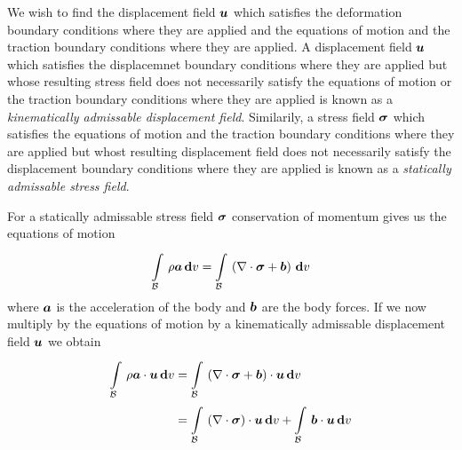 We wish to find the displacement field $\boldsymbol{u}$ which satisfies the
deformation boundary conditions where they are applied and the equations of
motion and the traction boundary conditions where they are applied. A
displacement field $\boldsymbol{u}$ which satisfies the displacemnet boundary
conditions where they are applied but whose resulting stress field does not
necessarily satisfy the equations of motion or the traction boundary
conditions where they are applied is known as a \emph{kinematically admissable
  displacement field}. Similarily, a stress field $\boldsymbol{\mathit{\sigma}}$ which
satisfies the equations of motion and the traction boundary conditions where
they are applied but whost resulting displacement field does not necessarily
satisfy the displacement boundary conditions where they are applied is known
as a \emph{statically admissable stress field}.

For a statically admissable stress field $\boldsymbol{\mathit{\sigma}}$ conservation of
momentum gives us the equations of motion \ie
\begin{equation}
  \gint{\embedmanifold{B}}{}{\rho\vectr{a}}{v}=\gint{\embedmanifold{B}}{}{\pbrac{\divergence{}{\tensor{\sigma}}+\vectr{b}}}{v}
\end{equation}
where $\boldsymbol{a}$ is the acceleration of the body and $\boldsymbol{b}$ are the body
forces. If we now multiply by the equations of motion by a kinematically
admissable displacement field $\boldsymbol{u}$ we obtain
\begin{equation}
  \begin{split}
    \gint{\embedmanifold{B}}{}{\dotprod{\rho\vectr{a}}{\vectr{u}}}{v} &=
    \gint{\embedmanifold{B}}{}{\dotprod{\pbrac{\divergence{}{\tensor{\sigma}}+\vectr{b}}}{\vectr{u}}}{v}\\
    &=\gint{\embedmanifold{B}}{}{\dotprod{\pbrac{\divergence{}{\tensor{\sigma}}}}{\vectr{u}}}{v}+
    \gint{\embedmanifold{B}}{}{\dotprod{\vectr{b}}{\vectr{u}}}{v}
  \end{split}
  \label{eqn:equationsofwork}
\end{equation}

